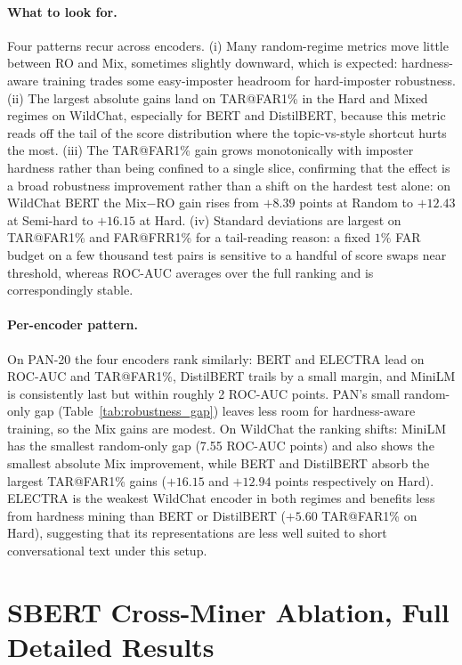 \documentclass[11pt]{article}
\begin{document}
\paragraph{What to look for.} Four patterns recur across encoders. (i) Many random-regime metrics move little between RO and Mix, sometimes slightly downward, which is expected: hardness-aware training trades some easy-imposter headroom for hard-imposter robustness. (ii) The largest absolute gains land on TAR@FAR1\% in the Hard and Mixed regimes on WildChat, especially for BERT and DistilBERT, because this metric reads off the tail of the score distribution where the topic-vs-style shortcut hurts the most. (iii) The TAR@FAR1\% gain grows monotonically with imposter hardness rather than being confined to a single slice, confirming that the effect is a broad robustness improvement rather than a shift on the hardest test alone: on WildChat BERT the Mix$-$RO gain rises from $+8.39$ points at Random to $+12.43$ at Semi-hard to $+16.15$ at Hard. (iv) Standard deviations are largest on TAR@FAR1\% and FAR@FRR1\% for a tail-reading reason: a fixed $1\%$ FAR budget on a few thousand test pairs is sensitive to a handful of score swaps near threshold, whereas ROC-AUC averages over the full ranking and is correspondingly stable.

\paragraph{Per-encoder pattern.} On PAN-20 the four encoders rank similarly: BERT and ELECTRA lead on ROC-AUC and TAR@FAR1\%, DistilBERT trails by a small margin, and MiniLM is consistently last but within roughly 2 ROC-AUC points. PAN's small random-only gap (Table~\ref{tab:robustness_gap}) leaves less room for hardness-aware training, so the Mix gains are modest. On WildChat the ranking shifts: MiniLM has the smallest random-only gap (7.55 ROC-AUC points) and also shows the smallest absolute Mix improvement, while BERT and DistilBERT absorb the largest TAR@FAR1\% gains ($+16.15$ and $+12.94$ points respectively on Hard). ELECTRA is the weakest WildChat encoder in both regimes and benefits less from hardness mining than BERT or DistilBERT ($+5.60$ TAR@FAR1\% on Hard), suggesting that its representations are less well suited to short conversational text under this setup.

\section{SBERT Cross-Miner Ablation, Full Detailed Results}
\label{sec:appendix_sbert}
\end{document}
